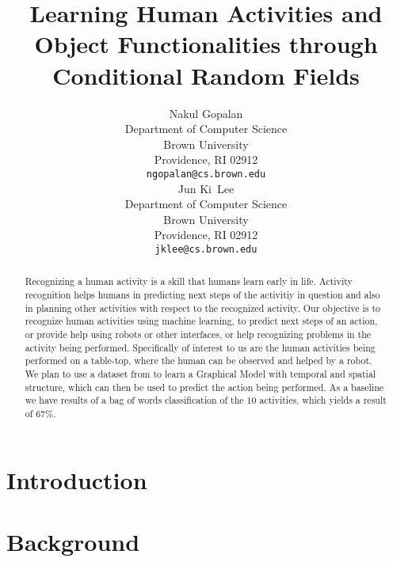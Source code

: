 \documentclass{article} %
\title{Learning Human Activities and Object Functionalities through Conditional Random Fields}
\author{
Nakul Gopalan\\
Department of Computer Science\\
Brown University\\
Providence, RI 02912 \\
\texttt{ngopalan@cs.brown.edu} \\
\And
Jun Ki~Lee\\
Department of Computer Science\\
Brown University\\
Providence, RI 02912 \\
\texttt{jklee@cs.brown.edu} \\
}
\begin{document}
\maketitle

\begin{abstract}
Recognizing a human activity is a skill that humans learn early in life. Activity recognition helps humans in predicting next steps of the activitiy in question and also in planning other activities with respect to the recognized activity. Our objective is to recognize human activities using machine learning, to predict next steps of an action, or provide help using robots or other interfaces, or help recognizing problems in the activity being performed. Specifically of interest to us are the human activities being performed on a table-top, where the human can be observed and helped by a robot. We plan to use a dataset from \cite{koppula2013detectingactivitiesrgbd} to learn a Graphical Model with temporal and spatial structure, which can then be used to predict the action being performed. As a baseline we have results of a bag of words classification of the $10$ activities, which yields a result of $67\%$.
\end{abstract}

\section{Introduction}

\section{Background}
\end{document}
